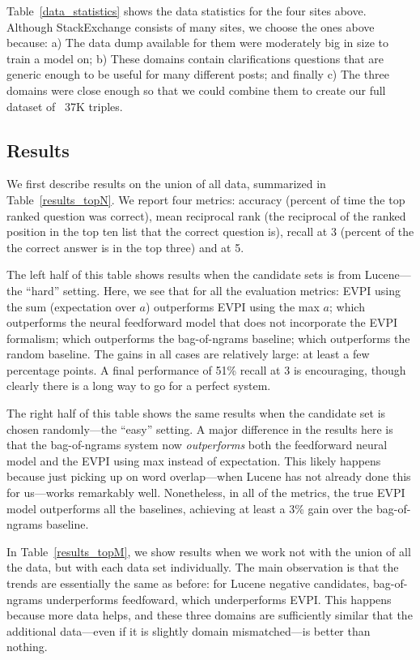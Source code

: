\documentclass[11pt]{report}
\begin{document}
Table~\ref{data_statistics} shows the data statistics for the four sites above.  Although StackExchange consists of many sites, we choose the ones above because: a) The data dump available for them were moderately big in size to train a model on; b) These domains contain clarifications questions that are generic enough to be useful for many different posts; and finally c) The three domains were close enough so that we could combine them to create our full dataset of ~37K triples.

\subsection{Results}

We first describe results on the union of all data, summarized in Table~\ref{results_topN}.
We report four metrics: accuracy (percent of time the top ranked question was correct),
mean reciprocal rank (the reciprocal of the ranked position in the top ten list that the correct question is), 
recall at 3 (percent of the the correct answer is in the top three) and
at 5.

The left half of this table shows results when the candidate sets is from Lucene---the ``hard'' setting.
Here, we see that for all the evaluation metrics:
EVPI using the sum (expectation over $a$) outperforms
EVPI using the max $a$;
which outperforms the neural feedforward model that does not incorporate the EVPI formalism;
which outperforms the bag-of-ngrams baseline;
which outperforms the random baseline.
The gains in all cases are relatively large: at least a few percentage points.
A final performance of 51\% recall at 3 is encouraging, though clearly there is a long way to go for a perfect system.

The right half of this table shows the same results when the candidate set is chosen randomly---the ``easy'' setting.
A major difference in the results here is that the bag-of-ngrams system now \emph{outperforms} both the feedforward neural model and the EVPI using max instead of expectation.
This likely happens because just picking up on word overlap---when Lucene has not already done this for us---works remarkably well.
Nonetheless, in all of the metrics, the true EVPI model outperforms all the baselines, achieving at least a 3\% gain over the bag-of-ngrams baseline.

In Table~\ref{results_topM}, we show results when we work not with the union of all the data, but with each data set individually.
The main observation is that the trends are essentially the same as before: for Lucene negative candidates, bag-of-ngrams underperforms feedfoward, which underperforms EVPI.
This happens because more data helps, and these three domains are sufficiently similar that the additional data---even if it is slightly domain mismatched---is better than nothing.
\end{document}
